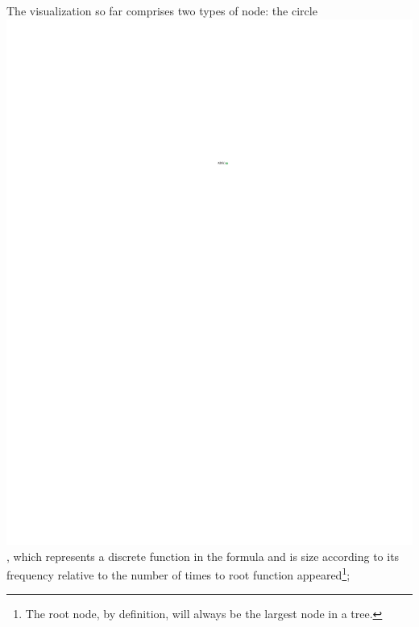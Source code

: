 \documentclass[conference]{IEEEtran}
\begin{document}
	The visualization so far comprises two types of node: the circle \includegraphics{glossary-greenonly}, which
	represents a discrete function in the formula and is size according to its
	frequency relative to the number of times to root function appeared\footnote{The root node, by definition, will
		always be the largest node in a tree.};
\end{document}
